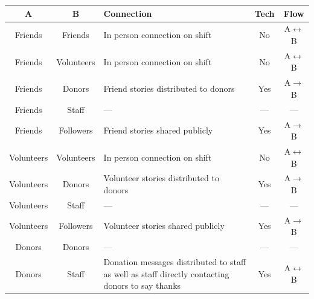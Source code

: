 \begin{table}[ht]
    \centering
    \begin{tabularx}{\textwidth}{ c | c | Y | c | c }
        \hline
        A          & B          & Connection                                                                                       & Tech & Flow                    \\ [0.5ex]
        \hline
        Friends    & Friends    & In person connection on shift                                                                    & No   & A$\longleftrightarrow$B \\
        Friends    & Volunteers & In person connection on shift                                                                    & No   & A$\longleftrightarrow$B \\
        Friends    & Donors     & Friend stories distributed to donors                                                             & Yes  & A$\longrightarrow$B     \\
        Friends    & Staff      & ---                                                                                              & ---  & ---                     \\
        Friends    & Followers  & Friend stories shared publicly                                                                   & Yes  & A$\longrightarrow$B     \\
        Volunteers & Volunteers & In person connection on shift                                                                    & No   & A$\longleftrightarrow$B \\
        Volunteers & Donors     & Volunteer stories distributed to donors                                                          & Yes  & A$\longrightarrow$B     \\
        Volunteers & Staff      & ---                                                                                              & ---  & ---                     \\
        Volunteers & Followers  & Volunteer stories shared publicly                                                                & Yes  & A$\longrightarrow$B     \\
        Donors     & Donors     & ---                                                                                              & ---  & ---                     \\
        Donors     & Staff      & Donation messages distributed to staff as well as staff directly contacting donors to say thanks & Yes  & A$\longleftrightarrow$B \\

\end{tabularx}
\end{table}
